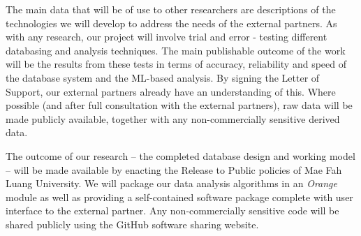 \documentclass[11pt]{article}
\begin{document}
\vspace{2mm}
\noindent
The main data that will be of use to other researchers are descriptions of the technologies we will develop to address the needs of the external partners. As with any research, our project will involve trial and error - testing different databasing and analysis techniques. The main publishable outcome of the work will be the results from these tests in terms of accuracy, reliability and speed of the database system and the ML-based analysis. By signing the Letter of Support, our external partners already have an understanding of this. Where possible (and after full consultation with the external partners), raw data will be made publicly available, together with any non-commercially sensitive derived data.

\vspace{2mm}
\noindent
 The outcome of our research  -- the completed database design and working model -- will be made available by enacting the Release to Public policies of Mae Fah Luang University. We will package our data analysis algorithms in an {\it Orange} module as well as providing a self-contained software package complete with user interface to the external partner. Any non-commercially sensitive code will be shared publicly using the GitHub software sharing website.




\end{document}
